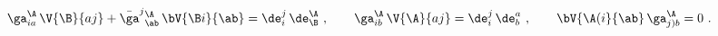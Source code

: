 \begin{equation} \label{gammaV}
  \ga^\A_{ia}\, \V{\B}{aj} + \bar{\ga}^j{}^\A_\ab\, \bV{\B i}{\ab}
  = \de_i^j\, \de^\A_\B\ ,\qquad \ga_{ib}^\A\, \V{\A}{aj} = \de_i^j\,
  \de_b^a\ ,\qquad \bV{\A(i}{\ab}\, \ga_{j)b}^\A = 0\ .
 \end{equation}

